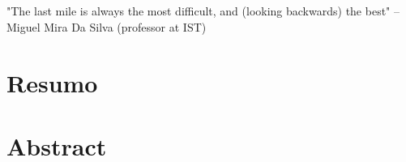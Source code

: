 \cleardoublepage


\chapter*{}
\thispagestyle{empty}

\vfill
\mbox{}
\vfill\Large
\begin{flushright}
  \begin{minipage}{8cm}
    \begin{center}

"The last mile is always the most difficult, and (looking backwards) the best" -- Miguel Mira Da Silva (professor at IST)

    \end{center}
  \end{minipage}
\end{flushright}
\normalsize\vfill

\cleardoublepage


\chapter*{Resumo}
\thispagestyle{empty}

\newpage


\chapter*{Abstract}
\thispagestyle{empty}

